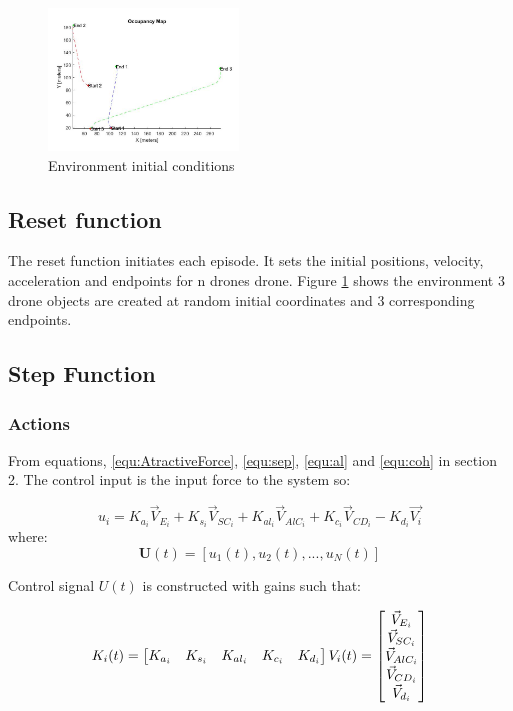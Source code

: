 \clearpage

 \begin{figure}
\begin{center}
    \includegraphics[width=0.45\textwidth]{figures/DroneInitial.jpg}
    \end{center}
    \caption{Environment initial conditions}
    \label{fig:Drone Initial}
\end{figure}

\subsection{Reset function}
The reset function initiates each episode. It sets the initial positions, velocity, acceleration and endpoints for n drones drone. Figure \ref{fig:Drone Initial} shows the environment 3 drone objects are created at random initial coordinates and 3 corresponding endpoints.

\subsection{Step Function}

\subsubsection{Actions}
From equations, \ref{equ:AtractiveForce}, \ref{equ:sep}, \ref{equ:al} and \ref{equ:coh} in section 2. The control input is the input force to the system so:

\[u_{i} = K_{a_i}\vec{V}_{E_i} + K_{s_i}\vec{V}_{SC_i} + K_{al_i}\vec{V}_{AlC_i} + K_{c_i}\vec{V}_{CD_i} - K_{d_i}\vec{V_i}\]
where:
\[{{\textbf{U}}}(t) = [u_1(t), u_2(t),..., u_N(t)]\]

\noindent
Control signal $U(t)$ is constructed with gains such that:


\begin{align*}
 K_i(t) &= 
    \begin{bmatrix*}[r]
        K_{a_i} & K_{s_i} & K_{al_i} & K_{c_i} & K_{d_i}\\
    \end{bmatrix*}
    V_i(t) = 
    \begin{bmatrix*}
        \vec{V}_{E_i}\\
        \vec{V}_{SC_i}\\
        \vec{V}_{AlC_i}\\
        \vec{V}_{CD_i}\\
        \vec{V}_{d_i}
    \end{bmatrix*}\\
    \centering
\end{align*}
   


